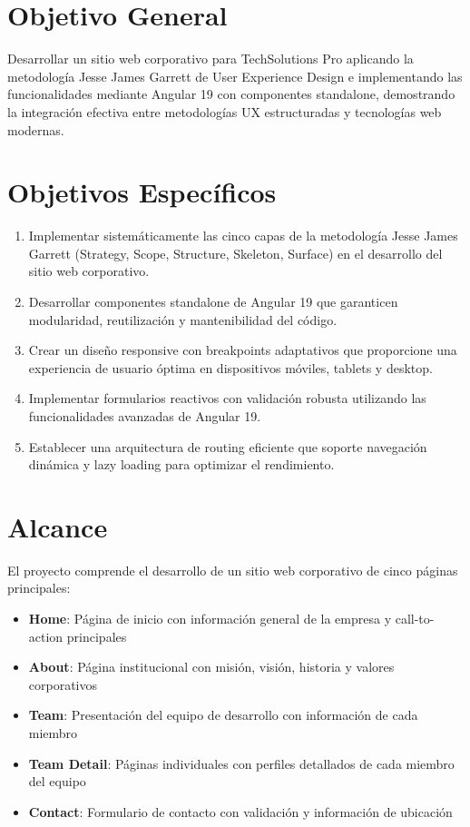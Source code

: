 \section{Objetivo General}

Desarrollar un sitio web corporativo para TechSolutions Pro aplicando la metodología Jesse James Garrett de User Experience Design e implementando las funcionalidades mediante Angular 19 con componentes standalone, demostrando la integración efectiva entre metodologías UX estructuradas y tecnologías web modernas.

\section{Objetivos Específicos}

\begin{enumerate}
    \item Implementar sistemáticamente las cinco capas de la metodología Jesse James Garrett (Strategy, Scope, Structure, Skeleton, Surface) en el desarrollo del sitio web corporativo.
    
    \item Desarrollar componentes standalone de Angular 19 que garanticen modularidad, reutilización y mantenibilidad del código.
    
    \item Crear un diseño responsive con breakpoints adaptativos que proporcione una experiencia de usuario óptima en dispositivos móviles, tablets y desktop.
    
    \item Implementar formularios reactivos con validación robusta utilizando las funcionalidades avanzadas de Angular 19.
    
    \item Establecer una arquitectura de routing eficiente que soporte navegación dinámica y lazy loading para optimizar el rendimiento.
\end{enumerate}

\section{Alcance}

El proyecto comprende el desarrollo de un sitio web corporativo de cinco páginas principales:

\begin{itemize}
    \item \textbf{Home}: Página de inicio con información general de la empresa y call-to-action principales
    \item \textbf{About}: Página institucional con misión, visión, historia y valores corporativos
    \item \textbf{Team}: Presentación del equipo de desarrollo con información de cada miembro
    \item \textbf{Team Detail}: Páginas individuales con perfiles detallados de cada miembro del equipo
    \item \textbf{Contact}: Formulario de contacto con validación y información de ubicación
\end{itemize}

